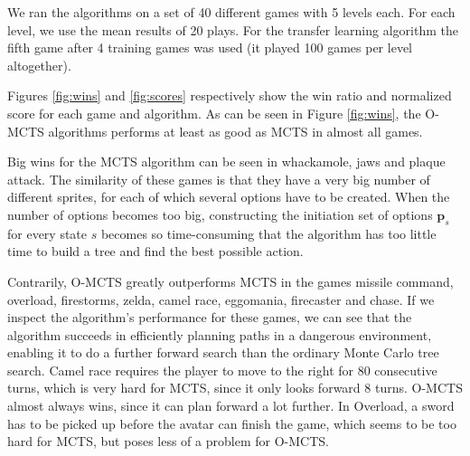 We ran the algorithms on a set of 40 different games with 5 levels each. For
each level, we use the mean results of 20 plays. For the transfer learning
algorithm the fifth game after 4 training games was used (it played 100
games per level altogether).

Figures \ref{fig:wins} and \ref{fig:scores} respectively show the win ratio and
normalized score for each game and algorithm. As can be seen in Figure
\ref{fig:wins}, the O-MCTS algorithms performs at least as good as MCTS in
almost all games. 

Big wins for the MCTS algorithm can be seen in whackamole, jaws and plaque
attack. The similarity of these games is that they have a very big number of
different sprites, for each of which several options have to be created.
When the number of options becomes too big, constructing the initiation set of
options $\mathbf{p}_s$ for every state $s$ becomes so time-consuming that the
algorithm has too little time to build a tree and find the best possible
action.

Contrarily, O-MCTS greatly outperforms MCTS in the games missile command,
overload, firestorms, zelda, camel race, eggomania, firecaster and chase. If we
inspect the algorithm's performance for these games, we can see that the
algorithm succeeds in efficiently planning paths in a dangerous environment,
enabling it to do a further forward search than the ordinary Monte Carlo tree
search. Camel race requires the player to move to the right for 80 consecutive
turns, which is very hard for MCTS, since it only looks forward 8 turns. O-MCTS
almost always wins, since it can plan forward a lot further. In Overload, a
sword has to be picked up before the avatar can finish the game, which seems to
be too hard for MCTS, but poses less of a problem for O-MCTS.

